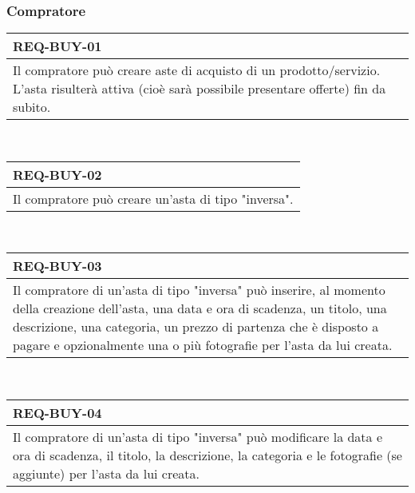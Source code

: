             \subsubsection{Compratore}
                \begin{tabular}{|p{}|}
                    \hline
                    \multicolumn{1}{|l|}{\cellcolor{head}\textbf{REQ-BUY-01}} \\
                    \hline
                    Il compratore può creare aste di acquisto di un prodotto/servizio. L'asta risulterà attiva (cioè sarà possibile presentare offerte) fin da subito. \\
                    \hline
                \end{tabular} \smallskip \\
                \begin{tabular}{|p{}|}
                    \hline
                    \multicolumn{1}{|l|}{\cellcolor{head}\textbf{REQ-BUY-02}} \\
                    \hline
                    Il compratore può creare un'asta di tipo "inversa". \\
                    \hline
                \end{tabular} \smallskip \\
                \begin{tabular}{|p{}|}
                    \hline
                    \multicolumn{1}{|l|}{\cellcolor{head}\textbf{REQ-BUY-03}} \\
                    \hline
                    Il compratore di un'asta di tipo "inversa" può inserire, al momento della creazione dell'asta, una data e ora di scadenza, un titolo, una descrizione, una categoria, un prezzo di partenza che è disposto a pagare e opzionalmente una o più fotografie per l'asta da lui creata. \\
                    \hline
                \end{tabular} \smallskip \\
                \begin{tabular}{|p{}|}
                    \hline
                    \multicolumn{1}{|l|}{\cellcolor{head}\textbf{REQ-BUY-04}} \\
                    \hline
                    Il compratore di un'asta di tipo "inversa" può modificare la data e ora di scadenza, il titolo, la descrizione, la categoria e le fotografie (se aggiunte) per l'asta da lui creata. \\
                    \hline
                \end{tabular} \smallskip \\
